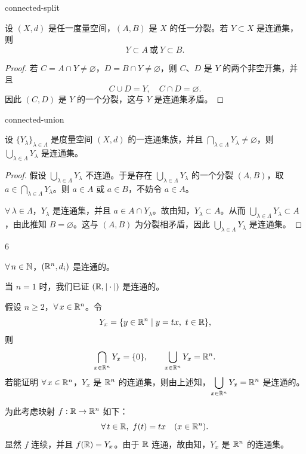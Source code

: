 \begin{mythm}{}{connected-split}

设 $(X,d)$ 是任一度量空间，$(A,B)$ 是 $X$ 的任一分裂。若 $Y\subset X$ 是连通集，则
\[Y\subset A\ \text{或}\ Y\subset B.\]

\end{mythm}

\begin{proof}

若 $C=A\cap Y\neq\varnothing$，$D=B\cap Y\neq\varnothing$，则 $C$、$D$ 是 $Y$ 的两个非空开集，并且
\[C\cup D=Y,\quad C\cap D=\varnothing.\]
因此 $(C,D)$ 是 $Y$ 的一个分裂，这与 $Y$ 是连通集矛盾。

\end{proof}

\begin{mythm}{}{connected-union}

设 $\{Y_{\lambda}\}_{\lambda\in\Lambda}$ 是度量空间 $(X,d)$ 的一连通集族，并且 $\displaystyle\bigcap_{\lambda\in\Lambda}Y_{\lambda}\neq\varnothing$，则 $\displaystyle\bigcup_{\lambda\in\Lambda}Y_{\lambda}$ 是连通集。

\end{mythm}

\begin{proof}

假设 $\displaystyle\bigcup_{\lambda\in\Lambda}Y_{\lambda}$ 不连通。于是存在 $\displaystyle\bigcup_{\lambda\in\Lambda}Y_{\lambda}$ 的一个分裂 $(A,B)$，取 $a\in\displaystyle\bigcap_{\lambda\in\Lambda}Y_{\lambda}$。则 $a\in A$ 或 $a\in B$，不妨令 $a\in A$。

$\forall\,\lambda\in\Lambda$，$Y_{\lambda}$ 是连通集，并且 $a\in A\cap Y_{\lambda}$。故由知，$Y_{\lambda}\subset A$。从而 $\displaystyle\bigcup_{\lambda\in\Lambda}Y_{\lambda}\subset A$，由此推知 $B=\varnothing$。这与 $(A,B)$ 为分裂相矛盾，因此 $\displaystyle\bigcup_{\lambda\in\Lambda}Y_{\lambda}$ 是连通集。

\end{proof}

\begin{sourceexample}{6}

$\forall\,n\in\mathbb{N}$，$(\mathbb{R}^n,d_i)$ 是连通的。

当 $n=1$ 时，我们已证 $(\mathbb{R},|\cdot|)$ 是连通的。

假设 $n\geqslant2$，$\forall\,x\in\mathbb{R}^n$。令
\[Y_x=\{y\in\mathbb{R}^n\mid y=tx,\ t\in\mathbb{R}\},\]
则
\[\bigcap_{x\in\mathbb{R}^n}Y_x=\{0\},\qquad\bigcup_{x\in\mathbb{R}^n}Y_x=\mathbb{R}^n.\]
若能证明 $\forall\,x\in\mathbb{R}^n$，$Y_x$ 是 $\mathbb{R}^n$ 的连通集，则由上述知，$\displaystyle\bigcup_{x\in\mathbb{R}^n}Y_x=\mathbb{R}^n$ 是连通的。

为此考虑映射 $f:\mathbb{R}\to\mathbb{R}^n$ 如下：
\[\forall\,t\in\R,\ f(t)=tx\quad(x\in\R^n).\]
显然 $f$ 连续，并且 $f(\mathbb{R})=Y_x$。由于 $\mathbb{R}$ 连通，故由知，$Y_x$ 是 $\mathbb{R}^n$ 的连通集。

\end{sourceexample}

